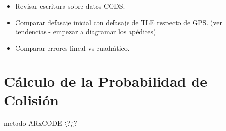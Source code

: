 \begin{itemize}
 \item Revisar escritura sobre datos CODS.
 \item Comparar defasaje inicial con defasaje de TLE respecto de GPS. (ver tendencias - empezar a diagramar los apédices)
 \item Comparar errores lineal vs cuadr\'atico.
\end{itemize}

\section{C\'alculo de la Probabilidad de Colisi\'on}
metodo ARxCODE ¿?¿?
